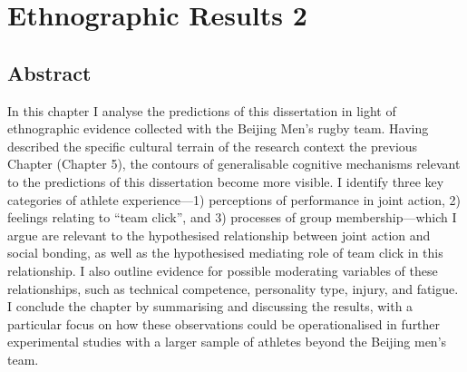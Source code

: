 \chapter{\label{6ethnographicResults}Ethnographic Results 2}

\minitoc



\section{Abstract}
In this chapter I analyse the predictions of this dissertation in light of ethnographic evidence collected with the Beijing Men's rugby team.  Having described the specific cultural terrain of the research context the previous Chapter (Chapter 5), the contours of generalisable cognitive mechanisms relevant to the predictions of this dissertation become more visible. I identify three key categories of athlete experience---1) perceptions of performance in joint action, 2) feelings relating to ``team click'', and 3) processes of group membership---which I argue are relevant to the hypothesised relationship between joint action and social bonding, as well as the hypothesised mediating role of team click in this relationship. I also outline evidence for possible moderating variables of these relationships, such as technical competence, personality type, injury, and fatigue. I conclude the chapter by summarising and discussing the results, with a particular focus on how these observations could be operationalised in further experimental studies with a larger sample of athletes beyond the Beijing men's team.





